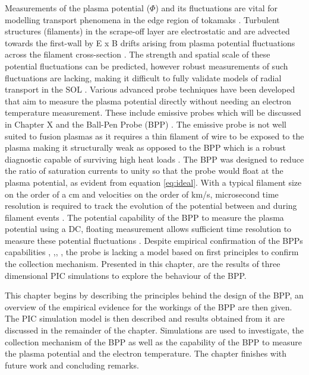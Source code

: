 Measurements of the plasma potential ($\Phi$) and its fluctuations are vital for modelling transport phenomena in the edge region of tokamaks \cite{Adamek2009}. Turbulent structures (filaments) in the scrape-off layer are electrostatic and are advected towards the first-wall by E x B drifts arising from plasma potential fluctuations across the filament cross-section \cite{filaments}. The strength and spatial scale of these potential fluctuations can be predicted, however robust measurements of such fluctuations are lacking, making it difficult to fully validate models of radial transport in the SOL \cite{blobs}. Various advanced probe techniques have been developed that aim to measure the plasma potential directly without needing an electron temperature measurement. These include emissive probes \cite{emissive} which will be discussed in Chapter X and the Ball-Pen Probe (BPP) \cite{BPP}. The emissive probe is not well suited to fusion plasmas as it requires a thin filament of wire to be exposed to the plasma making it structurally weak as opposed to the BPP which is a robust diagnostic capable of surviving high heat loads \cite{NW}. The BPP was designed to reduce the ratio of saturation currents to unity so that the probe would float at the plasma potential, as evident from equation \ref{eq:ideal}. With a typical filament size on the order of a cm and velocities on the order of km/s, microsecond time resolution is required to track the evolution of the potential between and during filament events \cite{filament_res}. The potential capability of the BPP to measure the plasma potential using a DC, floating measurement allows sufficient time resolution to measure these potential fluctuations \cite{BPP_resolution}. Despite empirical confirmation of the BPPs capabilities \cite{Adamek2009}, \cite{BPP},\cite{BPP-COMPASS}, \cite{BPP-MAST}, \cite{low_temp} the probe is lacking a model based on first principles to confirm the collection mechanism. Presented in this chapter, are the results of three dimensional PIC simulations to explore the behaviour of the BPP.


This chapter begins by describing the principles behind the design of the BPP, an overview of the empirical evidence for the workings of the BPP are then given. The PIC simulation model is then described and results obtained from it are discussed in the remainder of the chapter. Simulations are used to investigate, the collection mechanism of the BPP as well as the capability of the BPP to measure the plasma potential and the electron temperature. The chapter finishes with future work and concluding remarks. 


